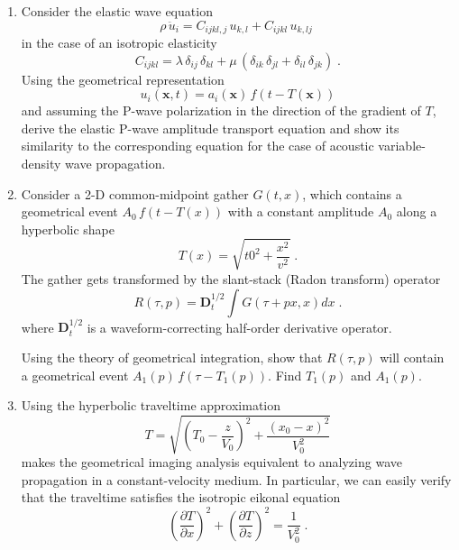 \begin{enumerate}
\item Consider the elastic wave equation
\begin{equation}
  \label{eq:ewave}
  \rho\,\ddot{u}_i = C_{ijkl,j}\,u_{k,l} + C_{ijkl}\,u_{k,lj}\;
\end{equation}
in the case of an isotropic elasticity
\begin{equation}
  \label{eq:lame}
  C_{ijkl} = \lambda\,\delta_{ij}\,\delta_{kl} + 
  \mu\,(\delta_{ik}\,\delta_{jl} + \delta_{il}\,\delta_{jk})\;.
\end{equation}
Using the geometrical representation
\begin{equation}
  u_i(\mathbf{x},t) = a_i(\mathbf{x})\,f\left(t-T(\mathbf{x})\right)
  \label{eq:gwave}
\end{equation}
and assuming the P-wave polarization in the direction of the gradient
of $T$, derive the elastic P-wave amplitude transport equation and
show its similarity to the corresponding equation for the case of
acoustic variable-density wave propagation.
\item Consider a 2-D common-midpoint gather $G(t,x)$, which
  contains a geometrical event $A_0\,f\left(t-T(x)\right)$ with a
  constant amplitude $A_0$ along a hyperbolic shape
\begin{equation}
\label{eq:hyper}
T(x) = \sqrt{t0^2+\frac{x^2}{v^2}}\;.
\end{equation}
The gather gets transformed by the slant-stack (Radon transform) operator
\begin{equation}
\label{eq:radon}
R(\tau,p) = \mathbf{D}_t^{1/2} \int G(\tau + p x, x) d x\;.
\end{equation}
where $ \mathbf{D}_t^{1/2}$ is a waveform-correcting half-order
derivative operator.

Using the theory of geometrical integration, show that $R(\tau,p)$
will contain a geometrical event $A_1(p)\,f\left(\tau-T_1(p)\right)$.
Find $T_1(p)$ and $A_1(p)$.

\item Using the hyperbolic traveltime approximation
\begin{equation}
T = \sqrt{\left(T_0-\frac{z}{V_0}\right)^2 + \frac{(x_0-x)^2}{V_0^2}}
\end{equation}
makes the geometrical imaging analysis equivalent to analyzing wave
propagation in a constant-velocity medium. In particular, we can easily
verify that the traveltime satisfies the isotropic eikonal equation 
\begin{equation}
\left(\frac{\partial T}{\partial x}\right)^2 + \left(\frac{\partial T}{\partial z}\right)^2 = \frac{1}{V_0^2}\;.
\end{equation}


\end{enumerate}

